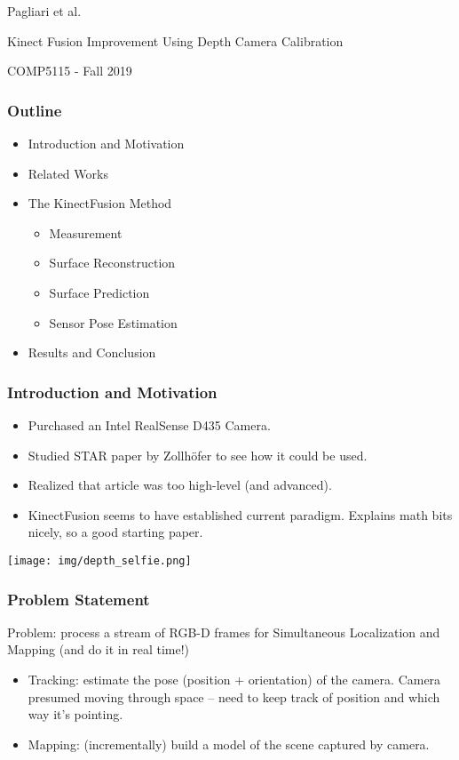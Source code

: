 \begin{frame}

\begin{center}
{\Large
Pagliari et al.

Kinect Fusion Improvement Using Depth Camera Calibration}

COMP5115 - Fall 2019
\end{center}
\end{frame}

\begin{frame}
\frametitle{Outline}

\begin{itemize}
\item Introduction and Motivation
\item Related Works
\item The KinectFusion Method
\begin{itemize}
  \item Measurement
  \item Surface Reconstruction
  \item Surface Prediction
  \item Sensor Pose Estimation
\end{itemize}
\item Results and Conclusion
\end{itemize}

\end{frame}

\begin{frame}
\frametitle{Introduction and Motivation}

\begin{itemize}
\item Purchased an Intel RealSense D435 Camera.
\item Studied STAR paper by Zollh\"ofer to see how it could be used.
\item Realized that article was too high-level (and advanced).
\item KinectFusion seems to have established current paradigm. Explains math bits nicely,
so a good starting paper.
\end{itemize}
\begin{center}
\texttt{[image: img/depth\_selfie.png]}
\end{center}
\end{frame}

\begin{frame}
\frametitle{Problem Statement}

Problem: process a stream of RGB-D frames for Simultaneous Localization and Mapping
(and do it in real time!)

\begin{itemize}
  \item Tracking: estimate the pose (position + orientation) of the camera.
  Camera presumed moving through space -- need to keep track of position and which way it's pointing.
  \item Mapping: (incrementally) build a model of the scene captured by camera.
\end{itemize}
\end{frame}

